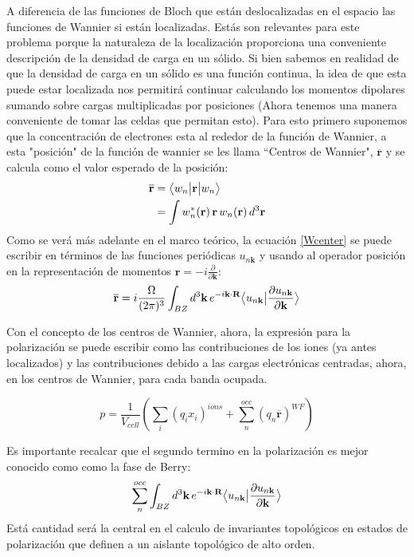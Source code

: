 A diferencia de las funciones de Bloch que están deslocalizadas en el espacio las funciones de Wannier si están localizadas. Estás son relevantes para este problema porque la naturaleza de la localización proporciona una conveniente descripción de la densidad de carga en un sólido. Si bien sabemos en
realidad de que la densidad de carga en un sólido es una función continua, la idea de que esta puede estar localizada nos permitirá continuar calculando los momentos dipolares sumando sobre cargas multiplicadas por posiciones (Ahora tenemos una manera conveniente de tomar las celdas que permitan esto).
Para esto primero suponemos que la concentración de electrones esta al rededor de la función de Wannier, a esta "posición" de la función de wannier se les llama ``Centros de Wannier", $\overline{\textbf{r}}$ y se calcula como el valor esperado de la posición:
\begin{equation}
\label{eq:Wcenter}
\begin{split}
        \overline{\textbf{r}} &= \big \langle{w_n}\big | {\textbf{r}} \big | {w_n} \big \rangle\\
        &= \int w^*_n(\textbf{r})\,\textbf{r}\, w_n(\textbf{r})\, d^3\textbf{r}
\end{split}
\end{equation}
Como se verá más adelante en el marco teórico, la ecuación \ref{Wcenter} se puede escribir en términos de las funciones periódicas $u_{n\textbf{k}}$ y usando al operador posición en la representación de momentos $\textbf{r} = -i\frac{\partial}{\partial\textbf{k}}$:
\begin{equation}
    \overline{\textbf{r}} = i\frac{\Omega}{(2\pi)^3} \int_{BZ} d^3\textbf{k}\,e^{-i\textbf{k}\cdot\textbf{R}}\big \langle{u_{n\textbf{k}}}\big | {\frac{\partial u_{n\textbf{k}} }{\partial\textbf{k}}} \big \rangle
\end{equation}

Con el concepto de los centros de Wannier, ahora, la expresión para la polarización se puede escribir como las contribuciones de los iones (ya antes localizados) y las contribuciones debido a las cargas electrónicas centradas, ahora, en los centros de Wannier, para cada banda ocupada.

\begin{equation}
    p = \frac{1}{V_{cell}} (\sum_i (q_i x_i)^{ions} + \sum_n^{occ}(q_n \overline{\textbf{r}})^{WF})
\end{equation}

Es importante recalcar que el segundo termino en la polarización es mejor conocido como como la fase de Berry:
\begin{equation}
    \label{eq:Barry_fase}
    \sum_n^{occ}\int_{BZ} d^3\textbf{k}\,e^{-i\textbf{k}\cdot\textbf{R}}\big \langle{u_{n\textbf{k}}}\big | {\frac{\partial u_{n\textbf{k}} }{\partial\textbf{k}}} \big \rangle
\end{equation}
Está cantidad será la central en el calculo de invariantes topológicos en estados de polarización que definen a un aislante topológico de alto orden. 


